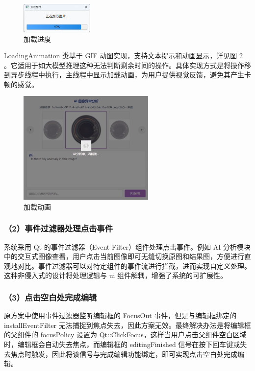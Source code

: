 \documentclass[
  ]{njuthesis}
\begin{document}
\begin{figure}[htb]
    \centering
    \includegraphics[width=0.32\textwidth]{images/加载进度.png}
    \caption{加载进度}
    \label{加载进度}
\end{figure}

LoadingAnimation 类基于 GIF 动图实现，支持文本提示和动画显示，详见图 \ref{加载动画} 。它适用于如大模型推理这种无法判断剩余时间的操作。具体实现方式是将操作移到异步线程中执行，主线程中显示加载动画，为用户提供视觉反馈，避免其产生卡顿的感觉。

\begin{figure}[H]
    \centering
    \includegraphics[width=0.6\textwidth]{images/加载动画.png}
    \caption{加载动画}
    \label{加载动画}
\end{figure}

\subsubsection{（2）事件过滤器处理点击事件}

系统采用 Qt 的事件过滤器（Event Filter）组件处理点击事件。例如 AI 分析模块中的交互式图像查看，用户点击当前图像即可无缝切换原图和结果图，方便进行直观地对比。事件过滤器可以对特定组件的事件流进行拦截，进而实现自定义处理。这种非侵入式的设计将处理逻辑与 ui 组件解耦，增强了系统的可扩展性。

\subsubsection{（3）点击空白处完成编辑}

原方案中使用事件过滤器监听编辑框的 FocusOut 事件，但是与编辑框绑定的 installEventFilter 无法捕捉到焦点失去，因此方案无效。最终解决办法是将编辑框的父组件的 focusPolicy 设置为 Qt::ClickFocus，这样当用户点击父组件空白区域时，编辑框会自动失去焦点，而编辑框的 editingFinished 信号在按下回车键或失去焦点时触发，因此将该信号与完成编辑功能绑定，即可实现点击空白处完成编辑。
\end{document}
